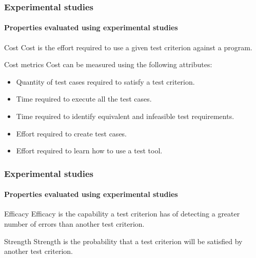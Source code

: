 \begin{frame}[parent={cmap:experimental-studies},hasnext=true,hasprev=true]
\frametitle{Experimental studies}
\framesubtitle{Properties evaluated using experimental studies}


\begin{block:concept}{Cost}
Cost is the effort required to use a given test criterion against a program.
\end{block:concept}

\begin{block:fact}{Cost metrics}
Cost can be measured using the following attributes:
\begin{itemize}
	\item Quantity of test cases required to satisfy a test criterion.
	\item Time required to execute all the test cases.
	\item Time required to identify equivalent and infeasible test requirements.
	\item Effort required to create test cases.
	\item Effort required to learn how to use a test tool.
\end{itemize}
\end{block:fact}
\end{frame}


\begin{frame}
\frametitle{Experimental studies}
\framesubtitle{Properties evaluated using experimental studies}


\begin{block:concept}{Efficacy}
Efficacy is the capability a test criterion has of detecting a greater number
of errors than another test criterion.
\end{block:concept}

\begin{block:concept}{Strength}
Strength is the probability that a test criterion will be satisfied by another
test criterion.
\end{block:concept}
\end{frame}


